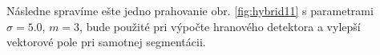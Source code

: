 \documentclass[a4paper,11pt,oneside]{article}%
\begin{document}
Následne spravíme ešte jedno prahovanie obr. \ref{fig:hybrid11} s parametrami $\sigma = 5.0$, $m = 3$, bude použité pri výpočte hranového detektora a vylepší vektorové pole pri samotnej segmentácii.

 \begin{figure}[H]  
    \hspace{5px}

\end{figure}
\end{document}
